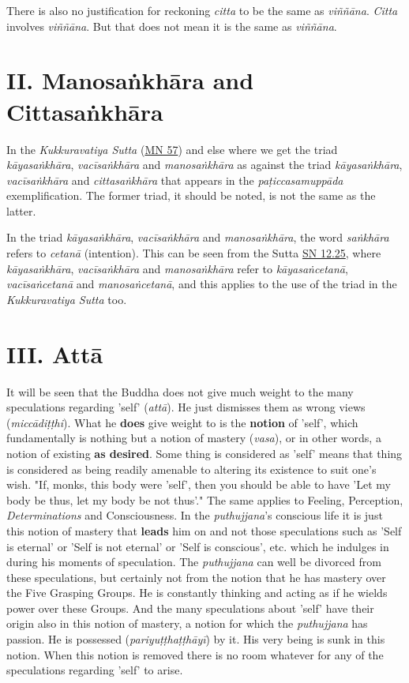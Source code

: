 There is also no justification for reckoning \emph{citta} to be the same as
\emph{viññāna}. \emph{Citta} involves \emph{viññāna}. But that does not mean it is
the same as \emph{viññāna}.


\hypertarget{x-ii.-manosaṅkhāra-and-cittasaṅkhāra}{\section*{II. Manosaṅkhāra and Cittasaṅkhāra}}
In the \emph{Kukkuravatiya Sutta} (\href{https://suttacentral.net/mn57/en/bodhi}{MN 57}) and else where we
get the triad \emph{kāyasaṅkhāra}, \emph{vacīsaṅkhāra} and \emph{manosaṅkhāra} as
against the triad \emph{kāyasaṅkhāra}, \emph{vacīsaṅkhāra} and \emph{cittasaṅkhāra}
that appears in the \emph{paṭiccasamuppāda} exemplification. The former
triad, it should be noted, is not the same as the latter.


In the triad \emph{kāyasaṅkhāra}, \emph{vacīsaṅkhāra} and \emph{manosaṅkhāra}, the
word \emph{saṅkhāra} refers to \emph{cetanā} (intention). This can be seen from the Sutta
\href{https://suttacentral.net/sn12.25/en/bodhi}{SN 12.25},
where \emph{kāyasaṅkhāra}, \emph{vacīsaṅkhāra} and \emph{manosaṅkhāra}
refer to \emph{kāyasaṅcetanā}, \emph{vacīsaṅcetanā} and \emph{manosaṅcetanā}, and
this applies to the use of the triad in the \emph{Kukkuravatiya Sutta} too.


\hypertarget{x-iii.-attā}{\section*{III. Attā}}
It will be seen that the Buddha does not give much weight to the many
speculations regarding 'self' (\emph{attā}). He just dismisses them as
wrong views (\emph{miccādiṭṭhi}). What he \textbf{does} give weight to is the
\textbf{notion} of 'self', which fundamentally is nothing but a notion of
mastery (\emph{vasa}), or in other words, a notion of existing \textbf{as desired}.
Some thing is considered as 'self' means that thing is
considered as being readily amenable to altering its existence to suit
one’s wish. "If, monks, this body were 'self', then you should be able
to have 'Let my body be thus, let my body be not thus'." The same
applies to Feeling, Perception, \emph{Determinations} and Consciousness. In
the \emph{puthujjana}'s conscious life it is just this notion of mastery
that \textbf{leads} him on and not those speculations such as 'Self is eternal'
or 'Self is not eternal' or 'Self is conscious', etc. which he indulges
in during his moments of speculation. The \emph{puthujjana} can well be
divorced from these speculations, but certainly not from the notion that
he has mastery over the Five Grasping Groups. He is constantly thinking
and acting as if he wields power over these Groups. And the many
speculations about 'self' have their origin also in this notion of
mastery, a notion for which the \emph{puthujjana} has passion. He is
possessed (\emph{pariyuṭṭhaṭṭhāyī}) by it. His very being is sunk in this
notion. When this notion is removed there is no room whatever for any of
the speculations regarding 'self' to arise.


